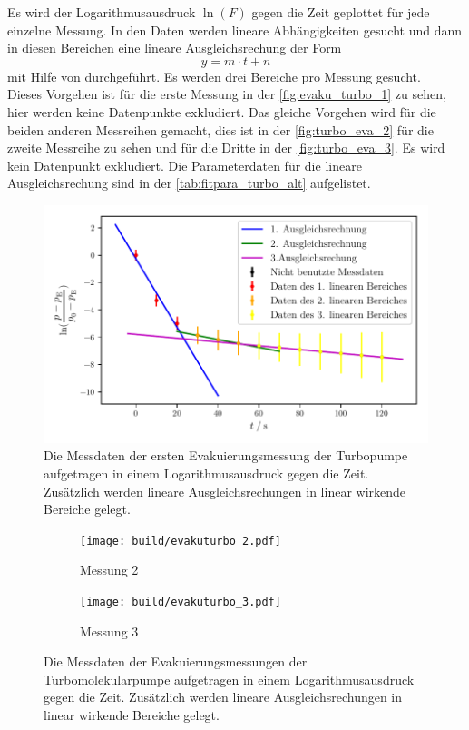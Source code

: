     \noindent Es wird der Logarithmusausdruck $\ln(F)$ gegen die Zeit geplottet für jede einzelne Messung. In den Daten werden lineare Abhängigkeiten gesucht und dann in diesen Bereichen
    eine lineare Ausgleichsrechung der Form 
    \begin{equation*}
      y = m \cdot t + n
    \end{equation*}
    mit Hilfe von \cite{scipy} durchgeführt. Es werden drei Bereiche pro Messung gesucht. \\
    Dieses Vorgehen ist für die erste Messung in der \autoref{fig:evaku_turbo_1} zu sehen, hier werden keine Datenpunkte exkludiert. Das gleiche Vorgehen wird für
    die beiden anderen Messreihen gemacht, dies ist in der \autoref{fig:turbo_eva_2} für die zweite Messreihe zu sehen und für die Dritte in der \autoref{fig:turbo_eva_3}. 
    Es wird kein Datenpunkt exkludiert. 
    Die Parameterdaten für die lineare Ausgleichsrechung sind in der \autoref{tab:fitpara_turbo_alt} aufgelistet. \\ 
    

    \begin{figure}[h]
      \centering
      \includegraphics[width=\textwidth]{build/evakuturbo_1_small.pdf}
      \caption{Die Messdaten der ersten Evakuierungsmessung der Turbopumpe aufgetragen in einem Logarithmusausdruck gegen die Zeit. Zusätzlich werden lineare Ausgleichsrechungen in linear wirkende Bereiche gelegt.}
      \label{fig:evaku_turbo_1}
    \end{figure}

    \begin{figure}[h]
      \begin{subfigure}{0.48\textwidth}
        \centering
        \texttt{[image: build/evakuturbo\_2.pdf]}
        \caption{Messung 2}
        \label{fig:turbo_eva_2}
      \end{subfigure}
      \hfill
      \begin{subfigure}{0.48\textwidth}
        \centering
        \texttt{[image: build/evakuturbo\_3.pdf]}
        \caption{Messung 3}
        \label{fig:turbo_eva_3}
      \end{subfigure}
      \caption{Die Messdaten der Evakuierungsmessungen der Turbomolekularpumpe aufgetragen in einem Logarithmusausdruck gegen die Zeit. 
      Zusätzlich werden lineare Ausgleichsrechungen in linear wirkende Bereiche gelegt.}
      \label{fig:turbo_eva_2_3}
    \end{figure}

